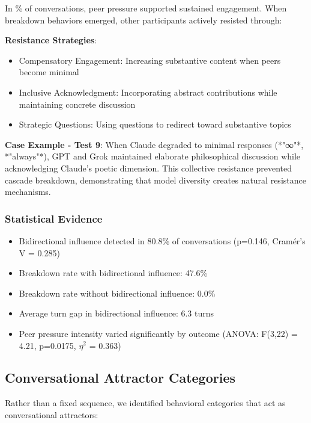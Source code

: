 \documentclass[11pt,letterpaper]{article}
\newcommand{\exponedataTotalSessionsRaw}{26}
\newcommand{\exponedataRecoverySessionsRaw}{9}
\newcommand{\exponedataRecoveryPercentage}{%
  \fpeval{round(\exponedataRecoverySessionsRaw / \exponedataTotalSessionsRaw * 100, 1)}\%
}
\newcommand{\exponedataBidirectionalPercentage}{80.8\%}
\newcommand{\exponedataBidirectionalPValue}{p=0.146}
\newcommand{\exponedataBidirectionalTurnGap}{6.3}
\newcommand{\exponedataBidirectionalBreakdownRate}{47.6\%}
\newcommand{\exponedataNonBidirectionalBreakdownRate}{0.0\%}
\newcommand{\exponedataPeerPressureANOVAPValue}{p=0.0175}
\begin{document}
In \exponedataRecoveryPercentage{} of conversations, peer pressure supported sustained engagement. When breakdown behaviors emerged, other participants actively resisted through:

\textbf{Resistance Strategies}:
\begin{itemize}
    \item Compensatory Engagement: Increasing substantive content when peers become minimal
    \item Inclusive Acknowledgment: Incorporating abstract contributions while maintaining concrete discussion
    \item Strategic Questions: Using questions to redirect toward substantive topics
\end{itemize}

\textbf{Case Example - Test 9}:
When Claude degraded to minimal responses (*"∞"*, *"always"*), GPT and Grok maintained elaborate philosophical discussion while acknowledging Claude's poetic dimension. This collective resistance prevented cascade breakdown, demonstrating that model diversity creates natural resistance mechanisms.

\subsubsection{Statistical Evidence}
\begin{itemize}
    \item Bidirectional influence detected in \exponedataBidirectionalPercentage{} of conversations (\exponedataBidirectionalPValue{}, Cramér's V = 0.285)
    \item Breakdown rate with bidirectional influence: \exponedataBidirectionalBreakdownRate{}
    \item Breakdown rate without bidirectional influence: \exponedataNonBidirectionalBreakdownRate{}
    \item Average turn gap in bidirectional influence: \exponedataBidirectionalTurnGap{} turns
    \item Peer pressure intensity varied significantly by outcome (ANOVA: F(3,22) = 4.21, \exponedataPeerPressureANOVAPValue{}, $\eta^2$ = 0.363)
\end{itemize}


\subsection{Conversational Attractor Categories}

Rather than a fixed sequence, we identified behavioral categories that act as conversational attractors:
\end{document}
